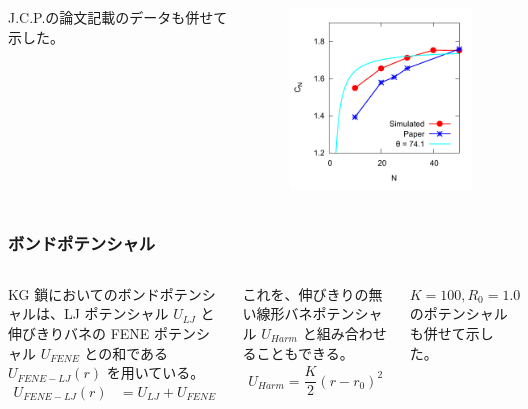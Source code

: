 \documentclass[11pt, dvipdfmx]{beamer}
\begin{document}
\begin{appendix}
\begin{frame}
\begin{columns}[totalwidth=1\textwidth]
J.C.P.の論文記載のデータも併せて示した。

\begin{figure}
\centering
\includegraphics[width=60mm]{./fig/C_ratio.pdf}
\end{figure}
\end{columns}
\end{frame}

\begin{frame}
\frametitle{ボンドポテンシャル}

\begin{columns}[totalwidth=1\textwidth]

\scriptsize
{}

KG 鎖においてのボンドポテンシャルは、LJ ポテンシャル $U_{LJ}$ と伸びきりバネの FENE ポテンシャル $U_{FENE}$ との和である $U_{FENE-LJ}(r)$ を用いている。
\begin{align*}
U_{FENE-LJ}(r) &= 
U_{LJ} + U_{FENE}
\end{align*}

これを、伸びきりの無い線形バネポテンシャル $U_{Harm}$ と組み合わせることもできる。
\begin{align*}
U_{Harm} = \dfrac{K}{2}(r-r_0)^2 
\end{align*}

$K=100, R_0=1.0$ のポテンシャルも併せて示した。
\begin{figure}
\centering
\includegraphics[width=60mm]{./fig/FENE.pdf}
\end{figure}
\end{columns}
\end{frame}


\end{appendix}
\end{document}
